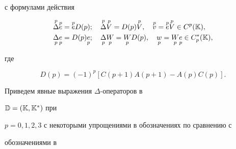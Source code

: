 с формулами действия 


\begin{equation} 


\begin{split} 


\up{p}{\Delta}\up{p}{e}&=\up{p}{e}D(p);\quad 


\up{p}{\Delta}\up{p}{V}=D(p)\up{p}{V},\quad 


\up{p}{v}=\up{p}{e}\up{p}{V}\in C^p(\Bbb K),\\ 


\down{p}{\Delta}\down{p}{e}&=D(p)\down{p}{e};\quad 


\down{p}{\Delta}\down{p}{W}=\down{p}{W}D(p),\quad 


\down{p}{w}=\down{p}{W}\down{p}{e}\in C^*_p(\Bbb K), 


\end{split} 


\end{equation} 


где 


$$ 


D(p)=(-1)^p[C(p+1)A(p+1)-A(p)C(p)]. 


$$ 


 


Приведем явные выражения $\Delta$-операторов в 


$\Bbb D=(\Bbb K,\Bbb K^*)$ при  


$p=0,1,2,3$ с некоторыми упрощениями в обозначениях по сравнению с 


обозначениями в \cite{2} 


